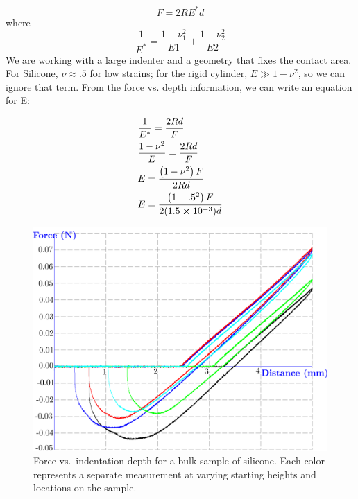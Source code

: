\begin{equation}
F=2RE^*d
\end{equation}
where 
\begin{equation*}
\frac{1}{E^*} = \frac{1-\nu_1^2}{E1} + \frac{1-\nu_2^2}{E2}
\end{equation*}
We are working with a large indenter and a geometry that fixes the contact area. For Silicone, $ \nu \approx .5$ for low strains; for the rigid cylinder, $ E \gg 1-\nu^2 $, so we can ignore that term. From the force vs. depth information, we can write an equation for E:

\begin{align}
&\frac{1}{E^*} = \frac{2Rd}{F} \\
&\frac{1 -\nu^2}{E} = \frac{2Rd}{F} \\
&E = \frac{\left( 1-\nu^2 \right) F}{2Rd} \\
&E = \frac{\left( 1-.5^2 \right) F}{2(1.5 \cross 10^{-3})d}
\end{align}

\begin{figure}[h!]
	\centering
	\includegraphics[width=.8\linewidth]{Chapters/Figures/190406_DC_1-1RT1-5_fixed.pdf}
	\caption[Bulk Modulus Test]{Force vs.~indentation depth for a bulk sample of silicone. Each color represents a separate measurement at varying starting heights and locations on the sample.}
	\label{fig:Bulkstiffness_raw}
\end{figure}

